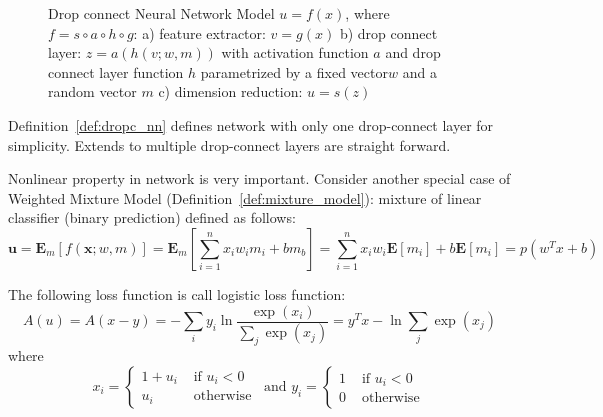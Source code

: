 \documentclass[9pt]{article}
\begin{document}
\begin{figure}[ht]
   \label{fig:model}
   \caption{
      Drop connect Neural Network Model $u=f(x)$, where 
      $f=s\circ a\circ h\circ g$:
      a) feature extractor: $v=g(x)$ 
      b) drop connect layer:
      $z=a(h(v;w,m))$ with activation function $a$ and drop connect
      layer function $h$ parametrized by a fixed vector$w$ and a random vector $m$
      c) dimension reduction: $u=s(z)$
   }
\end{figure}
\begin{remark}
   Definition~\ref{def:dropc_nn} defines network with only one drop-connect
   layer for simplicity. Extends to multiple drop-connect layers are straight forward.
\end{remark}
\begin{remark}
   Nonlinear property in network is very important. Consider another special case of
   Weighted Mixture Model (Definition~\ref{def:mixture_model}): mixture of
   linear classifier (binary prediction) defined as follows:
   \begin{equation}
      \label{eqn:logistic_classifier}
      \mathbf{u}= \mathbf{E}_m\left[f({\mathbf x};w,m)\right] = 
      \mathbf{E}_m\left[\sum_{i=1}^n x_{i}w_{i}m_i+bm_b\right]=
      \sum_{i=1}^nx_iw_i\mathbf{E}\left[m_i\right]
      + b\mathbf{E}\left[m_i\right]
      =p(w^Tx+b)
   \end{equation}
\end{remark}

\begin{definition}
The following loss function is call logistic loss function:
\begin{equation}
   \label{eqn:loss}
   A(u)=A(x-y)=-\sum_i y_i \ln \frac{\exp(x_i)}{\sum_j \exp(x_j)}=y^Tx-\ln\sum_j\exp(x_j)
\end{equation}
where 
$$
x_i=\left\{
    \begin{array}{ll}
        1+u_i & \mbox{ if $u_i<0$ } \\
         u_i & \mbox{ otherwise}
    \end{array}
    \right.
\mbox{  and    }
y_i = \left\{
    \begin{array}{ll}
        1 & \mbox{ if $u_i<0$ } \\
        0 & \mbox{ otherwise}
    \end{array}
    \right.
$$
\end{definition}
\end{document}
